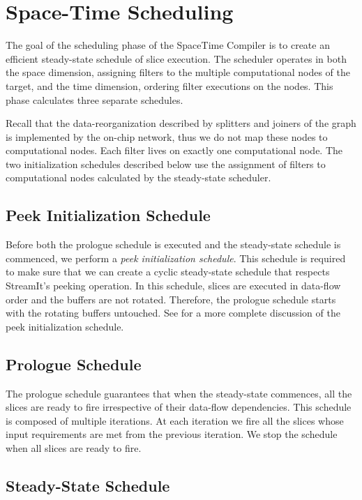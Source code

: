\section{Space-Time Scheduling}
\label{sec:scheduling}
The goal of the scheduling phase of the SpaceTime Compiler is to
create an efficient steady-state schedule of slice execution.  The
scheduler operates in both the space dimension, assigning filters to
the multiple computational nodes of the target, and the time
dimension, ordering filter executions on the nodes.  This phase calculates
three separate schedules.

Recall that the data-reorganization described by splitters and joiners
of the graph is implemented by the on-chip network, thus we do not map
these nodes to computational nodes.  Each filter lives on exactly one
computational node.  The two initialization schedules described below
use the assignment of filters to computational nodes calculated by the
steady-state scheduler.

\subsection{Peek Initialization Schedule}
Before both the prologue schedule is executed and the steady-state
schedule is commenced, we perform a {\it peek initialization
schedule}.  This schedule is required to make sure that we can create
a cyclic steady-state schedule that respects StreamIt's peeking
operation.  In this schedule, slices are executed in data-flow order
and the buffers are not rotated.  Therefore, the prologue schedule
starts with the rotating buffers untouched.  See
\cite{streamitcc} for a more complete discussion of the peek
initialization schedule.

\subsection{Prologue Schedule}
The prologue schedule guarantees that when the steady-state commences,
all the slices are ready to fire irrespective of their data-flow
dependencies.  This schedule is composed of multiple iterations.  At
each iteration we fire all the slices whose input requirements are met
from the previous iteration.  We stop the schedule when all slices are
ready to fire.

\subsection{Steady-State Schedule}

